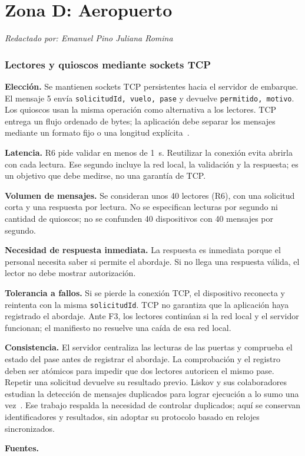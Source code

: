 \documentclass[11pt,a4paper]{article}
\newcommand{\autor}[1]{\par{\small\textit{Redactado por: #1}}\par}
\newcommand{\decision}[8]{\subsubsection*{#1}%
  \textbf{Elección.} #2\par
  \textbf{Latencia.} #3\par
  \textbf{Volumen de mensajes.} #4\par
  \textbf{Necesidad de respuesta inmediata.} #5\par
  \textbf{Tolerancia a fallos.} #6\par
  \textbf{Consistencia.} #7\par
  \textbf{Fuentes.} #8\par}
\newcommand{\integranteD}{Emanuel Pino Juliana Romina}
\begin{document}
\section{Zona D: Aeropuerto}\label{sec:zonaD}
\autor{\integranteD}

\decision{Lectores y quioscos mediante sockets TCP}
 {Se mantienen sockets TCP persistentes hacia el servidor de embarque. El mensaje 5 envía \texttt{solicitudId, vuelo, pase} y devuelve \texttt{permitido, motivo}. Los quioscos usan la misma operación como alternativa a los lectores. TCP entrega un flujo ordenado de bytes; la aplicación debe separar los mensajes mediante un formato fijo o una longitud explícita~\cite{tcp9293}.}
 {R6 pide validar en menos de 1~s. Reutilizar la conexión evita abrirla con cada lectura. Ese segundo incluye la red local, la validación y la respuesta; es un objetivo que debe medirse, no una garantía de TCP.}
 {Se consideran unos 40 lectores (R6), con una solicitud corta y una respuesta por lectura. No se especifican lecturas por segundo ni cantidad de quioscos; no se confunden 40 dispositivos con 40 mensajes por segundo.}
 {La respuesta es inmediata porque el personal necesita saber si permite el abordaje. Si no llega una respuesta válida, el lector no debe mostrar autorización.}
 {Si se pierde la conexión TCP, el dispositivo reconecta y reintenta con la misma \texttt{solicitudId}. TCP no garantiza que la aplicación haya registrado el abordaje. Ante F3, los lectores continúan si la red local y el servidor funcionan; el manifiesto no resuelve una caída de esa red local.}
 {El servidor centraliza las lecturas de las puertas y comprueba el estado del pase antes de registrar el abordaje. La comprobación y el registro deben ser atómicos para impedir que dos lectores autoricen el mismo pase. Repetir una solicitud devuelve su resultado previo. Liskov y sus colaboradores estudian la detección de mensajes duplicados para lograr ejecución a lo sumo una vez~\cite{liskov1991atmostonce}. Ese trabajo respalda la necesidad de controlar duplicados; aquí se conservan identificadores y resultados, sin adoptar su protocolo basado en relojes sincronizados.}
 {\cite{tcp9293,liskov1991atmostonce}}
\end{document}
